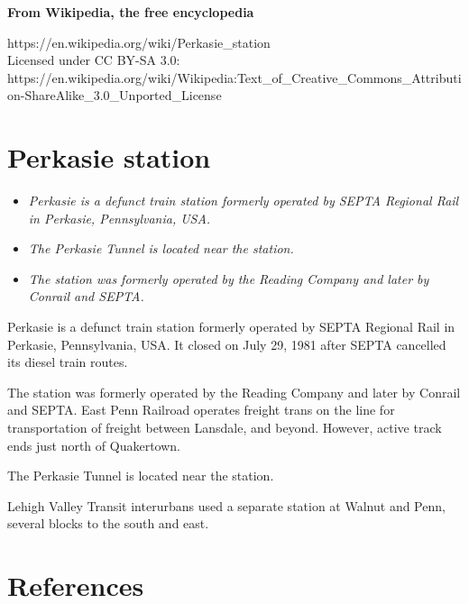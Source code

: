 \textbf{From Wikipedia, the free encyclopedia}

https://en.wikipedia.org/wiki/Perkasie\_station\\
Licensed under CC BY-SA 3.0:\\
https://en.wikipedia.org/wiki/Wikipedia:Text\_of\_Creative\_Commons\_Attribution-ShareAlike\_3.0\_Unported\_License

\section{Perkasie station}\label{perkasie-station}

\begin{itemize}
\item
  \emph{Perkasie is a defunct train station formerly operated by SEPTA
  Regional Rail in Perkasie, Pennsylvania, USA.}
\item
  \emph{The Perkasie Tunnel is located near the station.}
\item
  \emph{The station was formerly operated by the Reading Company and
  later by Conrail and SEPTA.}
\end{itemize}

Perkasie is a defunct train station formerly operated by SEPTA Regional
Rail in Perkasie, Pennsylvania, USA. It closed on July 29, 1981 after
SEPTA cancelled its diesel train routes.

The station was formerly operated by the Reading Company and later by
Conrail and SEPTA. East Penn Railroad operates freight trans on the line
for transportation of freight between Lansdale, and beyond. However,
active track ends just north of Quakertown.

The Perkasie Tunnel is located near the station.

Lehigh Valley Transit interurbans used a separate station at Walnut and
Penn, several blocks to the south and east.

\section{References}\label{references}
